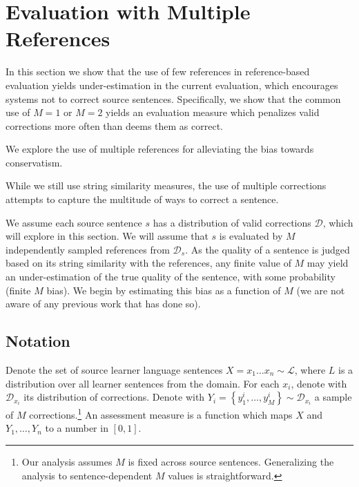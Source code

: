 \documentclass[english]{article}
\begin{document}
\section{Evaluation with Multiple References}\label{sec:increase-reference}

In this section we show that the use of few references in reference-based evaluation yields
under-estimation in the current evaluation, which encourages systems not to correct source
sentences. Specifically, we show that the common use of $M=1$ or $M=2$ yields an evaluation
measure which penalizes valid corrections more often than deems them as correct.

We explore the use of multiple references for alleviating the bias towards conservatism.

While we still use string similarity measures, the use of multiple corrections attempts
to capture the multitude of ways to correct a sentence.

We assume each source sentence $s$ has a distribution of valid corrections $\mathcal{D}$,
which will explore in this section. We will assume that $s$ is evaluated by
$M$ independently sampled references from $\mathcal{D}_s$.
As the quality of a sentence is judged based on its string similarity with the references,
any finite value of $M$ may yield an under-estimation of the true quality of the sentence, 
with some probability (finite $M$ bias). We begin by estimating this bias as a function of $M$
(we are not aware of any previous work that has done so).


\subsection{Notation}

Denote the set of source learner language sentences $X=x_{1}\ldots x_n\sim \mathcal{L}$, where
$L$ is a distribution over all learner sentences from the domain. For each $x_i$, denote
with $\mathcal{D}_{x_i}$ its distribution of corrections. Denote with
$Y_i = \left\{y_{1}^{i},\ldots, y_{M}^{i}\right\} \sim \mathcal{D}_{x_i}$ a sample of
$M$ corrections.\footnote{Our analysis assumes $M$ is fixed across source sentences.
  Generalizing the analysis to sentence-dependent $M$ values is straightforward.}
An assessment measure is a function which maps $X$ and $Y_1,\ldots,Y_n$ to
a number in $[0,1]$.
\end{document}
